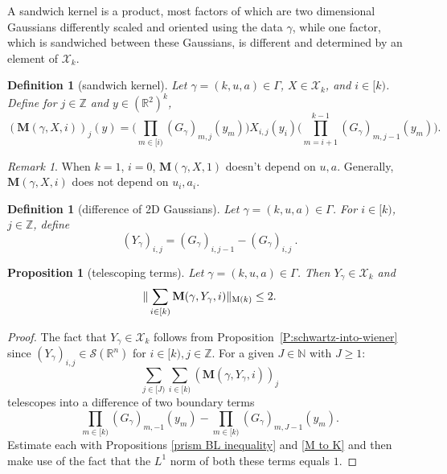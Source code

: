 \documentclass[12pt,reqno]{amsart}
\theoremstyle{plain}
\newtheorem{proposition}[theorem]{Proposition}
\newtheorem{definition}[theorem]{Definition}
\numberwithin{equation}{section}
\theoremstyle{remark}
\newtheorem{rem}{Remark}[section]
\newcommand{\uses}[1]{}
\newcommand{\usesdefs}[1]{}
\newcommand{\Z}{{\mathbb Z}}
\newcommand{\R}{{\mathbb R}}
\newcommand{\N}{{\mathbb N}}
\newcommand{\M}{\mathbf{M}}
\begin{document}
A sandwich kernel is a product, most factors of which are two dimensional Gaussians differently scaled and oriented
using the data $\gamma$, while one
factor, which is  sandwiched between these Gaussians, is different and determined by an element of $\mathcal{X}_k$.
\begin{definition}[sandwich kernel]\label{sandwich kernel}\uses{}\usesdefs{geometric parameters,double sequence of 2D functions,2D Gaussians}
Let $\gamma=(k,u,a)\in \Gamma$, $X\in \mathcal{X}_k$, and $i\in [k)$. Define for  $j\in \Z$ and $y\in (\R^{2})^k$,
\begin{equation}\label{auto:sandwich-kernel-definition} (\M(\gamma,X,i))_j(y) =  \Big(\prod_{m\in [i)} (G_{\gamma})_{m,j}(y_m) \Big) X_{i,j}(y_i) \Big(\prod_{m=i+1}^{k-1} (G_{\gamma})_{m,j-1}(y_m) \Big).\end{equation}
\end{definition}

\begin{rem}
When $k=1$, $i=0$, $\M(\gamma,X,1)$ doesn't depend on $u,a$.
Generally, $\M(\gamma,X,i)$ does not depend on $u_i, a_i$.
\end{rem}

\begin{definition}[difference of 2D Gaussians]\label{auto:Gaussian-difference-kernel-definition}\uses{}\usesdefs{geometric parameters,2D Gaussians}
Let $\gamma=(k,u,a)\in \Gamma$.  For $i\in [k)$, $j\in \Z$, define
\begin{equation}\label{auto:Gaussian-difference-kernel} (Y_\gamma)_{i,j} = (G_\gamma)_{i,j-1} - (G_\gamma)_{i,j}\ .\end{equation}
\end{definition}

\begin{proposition}[telescoping terms]\label{telescoping terms}\uses{P:schwartz-into-wiener,prism BL inequality,M to K}\usesdefs{geometric parameters,double sequence of 2D functions,kernel sequences,2D Gaussians,sandwich kernel,auto:Gaussian-difference-kernel-definition}
Let $\gamma=(k,u,a)\in \Gamma$.
Then $Y_\gamma\in \mathcal{X}_k$ and
\begin{equation}\label{auto:telescoping-terms-bound}
    \|\sum_{i\in [k)} \M(\gamma,Y_\gamma,i)\|_{{\rm M}(k)}\le 2.
\end{equation}
\end{proposition}

\begin{proof}
The fact that $Y_\gamma\in \mathcal{X}_k$ follows from Proposition~\ref{P:schwartz-into-wiener} since $(Y_\gamma)_{i,j}\in \mathcal S(\R^n)$ for $i\in [k), j\in \Z$.
For a given $J\in\N$ with $J\ge1$:
\[
\sum_{j\in [J)} \sum_{i\in [k)} (\M(\gamma,Y_\gamma,i))_j
\]
telescopes into a difference of two boundary terms
\[
\prod_{m\in [k)} (G_{\gamma})_{m,-1}(y_m) -\prod_{m\in [k)} (G_{\gamma})_{m,J-1}(y_m).
\]
Estimate each with Propositions \ref{prism BL inequality} and \ref{M to K} and then make use of the fact that the $L^1$ norm of both these terms equals $1$.
\end{proof}
\end{document}

